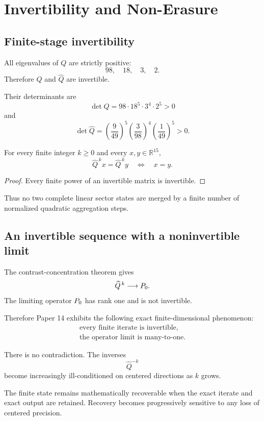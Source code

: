 \section{Invertibility and Non-Erasure}

\subsection{Finite-stage invertibility}

All eigenvalues of \(Q\) are strictly positive:
\[
98,\quad18,\quad3,\quad2.
\]
Therefore \(Q\) and \(\widehat{Q}\) are invertible.

Their determinants are
\[
\det Q
=
98\cdot18^5\cdot3^4\cdot2^5
>
0
\]
and
\[
\det\widehat{Q}
=
\left(\frac{9}{49}\right)^5
\left(\frac{3}{98}\right)^4
\left(\frac{1}{49}\right)^5
>
0.
\]

\begin{proposition}
For every finite integer \(k\ge0\) and every
\(x,y\in\mathbb R^{15}\),
\[
\widehat{Q}^{\,k}x
=
\widehat{Q}^{\,k}y
\quad\Longleftrightarrow\quad
x=y.
\]
\end{proposition}

\begin{proof}
Every finite power of an invertible matrix is invertible.
\end{proof}

Thus no two complete linear sector states are merged by a finite
number of normalized quadratic aggregation steps.

\subsection{An invertible sequence with a noninvertible limit}

The contrast-concentration theorem gives
\[
\widehat{Q}^{\,k}
\longrightarrow
P_{0}.
\]
The limiting operator \(P_{0}\) has rank one and is not invertible.

Therefore Paper 14 exhibits the following exact finite-dimensional
phenomenon:
\[
\begin{array}{c}
\text{every finite iterate is invertible},\\[0.3em]
\text{the operator limit is many-to-one}.
\end{array}
\]

There is no contradiction.  The inverses
\[
\widehat{Q}^{-k}
\]
become increasingly ill-conditioned on centered directions as
\(k\) grows.

The finite state remains mathematically recoverable when the exact
iterate and exact output are retained.  Recovery becomes
progressively sensitive to any loss of centered precision.

